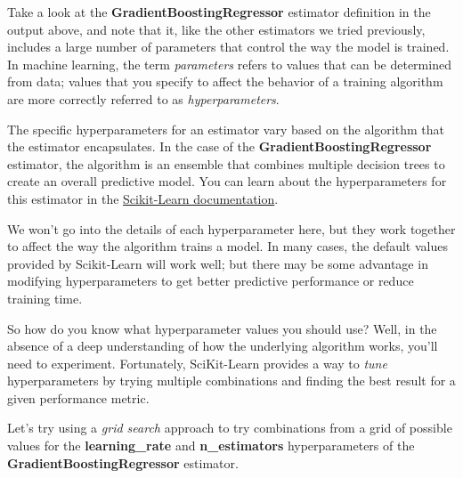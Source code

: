 \documentclass[11pt]{article}
\begin{document}
Take a look at the \textbf{GradientBoostingRegressor} estimator
definition in the output above, and note that it, like the other
estimators we tried previously, includes a large number of parameters
that control the way the model is trained. In machine learning, the term
\emph{parameters} refers to values that can be determined from data;
values that you specify to affect the behavior of a training algorithm
are more correctly referred to as \emph{hyperparameters}.

The specific hyperparameters for an estimator vary based on the
algorithm that the estimator encapsulates. In the case of the
\textbf{GradientBoostingRegressor} estimator, the algorithm is an
ensemble that combines multiple decision trees to create an overall
predictive model. You can learn about the hyperparameters for this
estimator in the
\href{https://scikit-learn.org/stable/modules/generated/sklearn.ensemble.GradientBoostingRegressor.html}{Scikit-Learn
documentation}.

We won't go into the details of each hyperparameter here, but they work
together to affect the way the algorithm trains a model. In many cases,
the default values provided by Scikit-Learn will work well; but there
may be some advantage in modifying hyperparameters to get better
predictive performance or reduce training time.

So how do you know what hyperparameter values you should use? Well, in
the absence of a deep understanding of how the underlying algorithm
works, you'll need to experiment. Fortunately, SciKit-Learn provides a
way to \emph{tune} hyperparameters by trying multiple combinations and
finding the best result for a given performance metric.

Let's try using a \emph{grid search} approach to try combinations from a
grid of possible values for the \textbf{learning\_rate} and
\textbf{n\_estimators} hyperparameters of the
\textbf{GradientBoostingRegressor} estimator.
\end{document}
